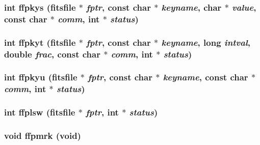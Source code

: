 \subsubsection{\setlength{\rightskip}{0pt plus 5cm}int ffpkys (\bf{fitsfile} $\ast$ {\em fptr}, const char $\ast$ {\em keyname}, char $\ast$ {\em value}, const char $\ast$ {\em comm}, int $\ast$ {\em status})}\label{fitsio__64_8h_3d860f3d7031a0ba399a769045eda878}


\subsubsection{\setlength{\rightskip}{0pt plus 5cm}int ffpkyt (\bf{fitsfile} $\ast$ {\em fptr}, const char $\ast$ {\em keyname}, long {\em intval}, double {\em frac}, const char $\ast$ {\em comm}, int $\ast$ {\em status})}\label{fitsio__64_8h_002c4753bb2fe0d01f18b7d920eaa8e6}


\subsubsection{\setlength{\rightskip}{0pt plus 5cm}int ffpkyu (\bf{fitsfile} $\ast$ {\em fptr}, const char $\ast$ {\em keyname}, const char $\ast$ {\em comm}, int $\ast$ {\em status})}\label{fitsio__64_8h_f93e8090a4a84d3fdb98b798e9a454a8}


\subsubsection{\setlength{\rightskip}{0pt plus 5cm}int ffplsw (\bf{fitsfile} $\ast$ {\em fptr}, int $\ast$ {\em status})}\label{fitsio__64_8h_961af8c215ce5bb2d2d74ba7d5b02591}


\subsubsection{\setlength{\rightskip}{0pt plus 5cm}void ffpmrk (void)}\label{fitsio__64_8h_b9700796363d20498ceec03ad6c3b976}


